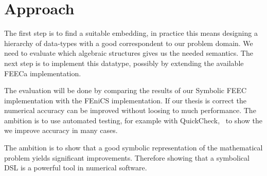 \documentclass{scrartcl}
\begin{document}
\section{Approach}


The first step is to find a suitable embedding, in practice this means
designing a hierarchy of data-types with a good correspondent to our problem
domain.  We need to evaluate which algebraic structures gives us the needed
semantics. The next step is to implement this datatype, possibly by extending
the available FEECa implementation.

The evaluation will be done by comparing the results of our Symbolic FEEC
implementation with the FEniCS implementation. If our thesis is correct the
numerical accuracy can be improved without loosing to much performance.
The ambition is to use automated testing, for example with
QuickCheck,~\cite{claessen_quickcheck_2000} to show the we improve accuracy in
many cases.


The ambition is to show that a good symbolic representation of the mathematical
problem yields significant improvements. Therefore showing that a symbolical DSL
is a powerful tool in numerical software.




\end{document}
